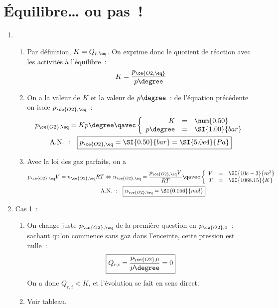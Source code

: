 \documentclass[a4paper, 12pt, final, garamond]{book}
\begin{document}
\section{Équilibre… ou pas~!}
\begin{enumerate}
    \item 
        \begin{enumerate}
            \item Par définition, $K = Q_{r, \eq}$. On exprime donc le
                quotient de réaction avec les activités à l'équilibre~:
                \[ K = \frac{p_{\ce{O2,\eq}}}{p\degree}\]
            \item On a la valeur de $K$ et la valeur de $p\degree$~: de
                l'équation précédente on isole $p_{\ce{O2}, \eq}$~:
                \begin{gather*}
                    p_{\ce{O2},\eq} = Kp\degree
                    \qavec
                    \left\{
                        \begin{array}{rcl}
                            K & = & \num{0.50}\\
                            p\degree & = & \SI{1.00}{bar}
                        \end{array}
                    \right.\\
                    \mathrm{A.N.~:}\quad
                    \boxed{p_{\ce{O2},\eq} = \SI{0.50}{bar} = \SI{5.0e4}{Pa}}
                \end{gather*}
            \item Avec la loi des gaz parfaits, on a
                \begin{gather*}
                    p_{\ce{O2},\eq}V = n_{\ce{O2}, \eq}RT
                    \Leftrightarrow
                    n_{\ce{O2}, \eq} = \frac{p_{\ce{O2},\eq}V}{RT}
                    \qavec
                    \left\{
                        \begin{array}{rcl}
                            V & = & \SI{10e-3}{m^3}\\
                            T & = & \SI{1068.15}{K}
                        \end{array}
                    \right.\\
                    \mathrm{A.N.~:}\quad
                    \boxed{n_{\ce{O2}, \eq} = \SI{0.056}{mol}}
                \end{gather*}
        \end{enumerate}
    \item Cas 1~:
    \begin{enumerate}
        \item On change juste $p_{\ce{O2},\eq}$ de la première question en
            $p_{\ce{O2}, 0}$~; sachant qu'on commence sans gaz dans l'enceinte,
            cette pression est nulle~:
            \[\boxed{Q_{r,i} = \frac{p_{\ce{O2}, 0}}{p\degree} = 0}\]
            On a donc $Q_{r,i} < K$, et l'évolution se fait en sens direct.
        \item Voir tableau.


\end{enumerate}
\end{enumerate}
\end{document}
